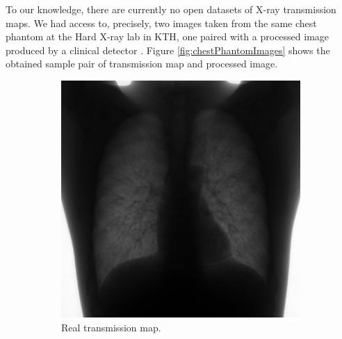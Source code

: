 \documentclass[nomenclature, english, bibtex]{kththesis}
\numberwithin{listing}{chapter}
\begin{document}
To our knowledge, there are currently no open datasets of X-ray transmission maps.
We had access to, precisely, two images taken from the same chest phantom at the Hard X-ray lab in KTH, one paired with a processed
image produced by a clinical detector . Figure \ref{fig:chestPhantomImages} shows the obtained sample pair of transmission map and
processed image.

\begin{figure}[H]
    \centering
    \begin{subfigure}[t]{0.45\textwidth}
        \includegraphics[width=\textwidth]{figures/comm_unprocessed_sample.jpg}
        \caption{Real transmission map.}
    \end{subfigure}
    \begin{subfigure}[t]{0.45\textwidth}

\end{subfigure}
\end{figure}
\end{document}
